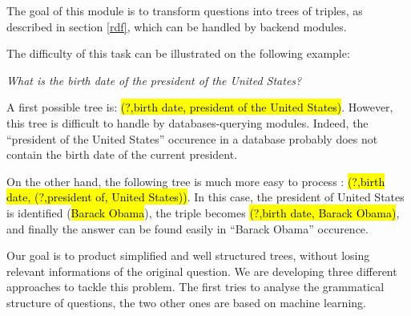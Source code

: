 
The goal of this module is to transform questions into trees of triples, as described in section \ref{rdf}, which can be handled by backend modules.

The difficulty of this task can be illustrated on the following example: 
\begin{center}
 \textit{What is the birth date of the president of the United States?}
\end{center}

A first possible tree is: \hl{(?,birth date, president of the United States)}. However, this tree is difficult to handle by databases-querying modules. Indeed, the ``president of the United States'' occurence in a database probably does not contain the birth date of the current president. 

On the other hand, the following tree is much more easy to process : \hl{(?,birth date, (?,president of, United States))}. In this case, the president of United States is identified (\hl{Barack Obama}), the triple becomes \hl{(?,birth date, Barack Obama)}, and finally the answer can be found easily in ``Barack Obama'' occurence.

Our goal is to product simplified and well structured trees, without losing relevant informations of the original question. We are developing three different approaches to tackle this problem. The first tries to analyse the grammatical structure of questions, the two other ones are based on machine learning.